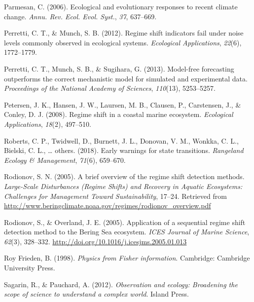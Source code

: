 \documentclass[12pt,twoside,openany]{reedthesis}
\begin{document}
\leavevmode\hypertarget{ref-parmesan_ecological_2006}{}%
Parmesan, C. (2006). Ecological and evolutionary responses to recent climate change. \emph{Annu. Rev. Ecol. Evol. Syst.}, \emph{37}, 637--669.

\leavevmode\hypertarget{ref-perretti2012regime}{}%
Perretti, C. T., \& Munch, S. B. (2012). Regime shift indicators fail under noise levels commonly observed in ecological systems. \emph{Ecological Applications}, \emph{22}(6), 1772--1779.

\leavevmode\hypertarget{ref-perretti_model-free_2013}{}%
Perretti, C. T., Munch, S. B., \& Sugihara, G. (2013). Model-free forecasting outperforms the correct mechanistic model for simulated and experimental data. \emph{Proceedings of the National Academy of Sciences}, \emph{110}(13), 5253--5257.

\leavevmode\hypertarget{ref-petersen2008regime}{}%
Petersen, J. K., Hansen, J. W., Laursen, M. B., Clausen, P., Carstensen, J., \& Conley, D. J. (2008). Regime shift in a coastal marine ecosystem. \emph{Ecological Applications}, \emph{18}(2), 497--510.

\leavevmode\hypertarget{ref-roberts2018early}{}%
Roberts, C. P., Twidwell, D., Burnett, J. L., Donovan, V. M., Wonkka, C. L., Bielski, C. L., \ldots{} others. (2018). Early warnings for state transitions. \emph{Rangeland Ecology \& Management}, \emph{71}(6), 659--670.

\leavevmode\hypertarget{ref-rodionov_brief_2005}{}%
Rodionov, S. N. (2005). A brief overview of the regime shift detection methods. \emph{Large-Scale Disturbances (Regime Shifts) and Recovery in Aquatic Ecosystems: Challenges for Management Toward Sustainability}, 17--24. Retrieved from \url{http://www.beringclimate.noaa.gov/regimes/rodionov_overview.pdf}

\leavevmode\hypertarget{ref-rodionov_application_2005}{}%
Rodionov, S., \& Overland, J. E. (2005). Application of a sequential regime shift detection method to the Bering Sea ecosystem. \emph{ICES Journal of Marine Science}, \emph{62}(3), 328--332. \url{http://doi.org/10.1016/j.icesjms.2005.01.013}

\leavevmode\hypertarget{ref-frieden_physics_1998}{}%
Roy Frieden, B. (1998). \emph{Physics from Fisher information}. Cambridge: Cambridge University Press.

\leavevmode\hypertarget{ref-sagarin_observation_2012}{}%
Sagarin, R., \& Pauchard, A. (2012). \emph{Observation and ecology: Broadening the scope of science to understand a complex world}. Island Press.
\end{document}
